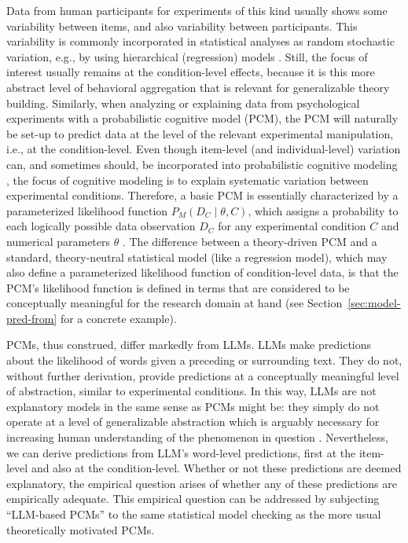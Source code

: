 \documentclass[fleqn]{article}
\begin{document}
Data from human participants for experiments of this kind usually shows some variability between items, and also variability between participants.
This variability is commonly incorporated in statistical analyses as random stochastic variation, e.g., by using hierarchical (regression) models \citep{Jaeger2008:Categorical-dat,barr2013,SorensenHohensteinb2016:Bayesian-linear}.
Still, the focus of interest usually remains at the condition-level effects, because it is this more abstract level of behavioral aggregation that is relevant for generalizable theory building.
Similarly, when analyzing or explaining data from psychological experiments with a probabilistic cognitive model (PCM), the PCM will naturally be set-up to predict data at the level of the relevant experimental manipulation, i.e., at the condition-level.
Even though item-level (and individual-level) variation can, and sometimes should, be incorporated into probabilistic cognitive modeling \citep[e.g.,][]{NilsonRieskamp2011:Hierarchical-Ba,Lee2011:How-Cognitive-M,ScheibehenneRieskamp2013:Testing-the-Ada}, the focus of cognitive modeling is to explain systematic variation between experimental conditions.
Therefore, a basic PCM is essentially characterized by a parameterized likelihood function $P_{M}(D_{C} \mid \theta, C)$, which assigns a probability to each logically possible data observation $D_{C}$ for any experimental condition $C$ and numerical parameters $\theta$ \citep{LewandowskyFarrell2011:Computational-M,LeeWagenmakers2013:Bayesian-Cognit}.
The difference between a theory-driven PCM and a standard, theory-neutral statistical model (like a regression model), which may also define a parameterized likelihood function of condition-level data, is that the PCM's likelihood function is defined in terms that are considered to be conceptually meaningful for the research domain at hand (see Section~\ref{sec:model-pred-from} for a concrete example).

PCMs, thus construed, differ markedly from LLMs.
LLMs make predictions about the likelihood of words given a preceding or surrounding text.
They do not, without further derivation, provide predictions at a conceptually meaningful level of abstraction, similar to experimental conditions.
In this way, LLMs are not explanatory models in the same sense as PCMs might be: they simply do not operate at a level of generalizable abstraction which is arguably necessary for increasing human understanding of the phenomenon in question \citep{Dellsen2020:Beyond-Explanat,Grimm2021:Understanding}.
Nevertheless, we can derive predictions from LLM's word-level predictions, first at the item-level and also at the condition-level.
Whether or not these predictions are deemed explanatory, the empirical question arises of whether any of these predictions are empirically adequate.
This empirical question can be addressed by subjecting ``LLM-based PCMs'' to the same statistical model checking as the more usual theoretically motivated PCMs.
\end{document}
